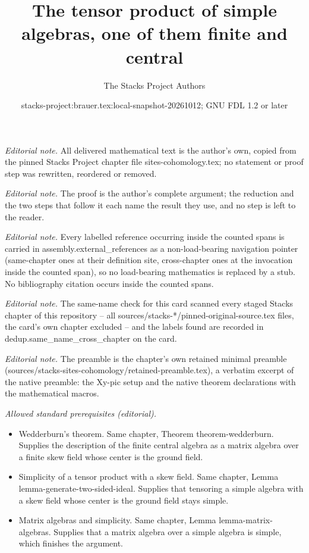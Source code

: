\documentclass[10pt,a4paper]{amsart}
\title{The tensor product of simple algebras, one of them finite and central}
\author{The Stacks Project Authors}
\date{stacks-project:brauer.tex:local-snapshot-20261012; GNU FDL 1.2 or later}
\theoremstyle{plain}
\theoremstyle{definition}
\theoremstyle{remark}
\numberwithin{equation}{subsection}
\begin{document}
\maketitle
\noindent\textit{Editorial note.} All delivered mathematical text is the author's own, copied from the pinned Stacks Project chapter file sites-cohomology.tex; no statement or proof step was rewritten, reordered or removed.\par\medskip
\noindent\textit{Editorial note.} The proof is the author's complete argument; the reduction and the two steps that follow it each name the result they use, and no step is left to the reader.\par\medskip
\noindent\textit{Editorial note.} Every labelled reference occurring inside the counted spans is carried in assembly.external\_references as a non-load-bearing navigation pointer (same-chapter ones at their definition site, cross-chapter ones at the invocation inside the counted span), so no load-bearing mathematics is replaced by a stub. No bibliography citation occurs inside the counted spans.\par\medskip
\noindent\textit{Editorial note.} The same-name check for this card scanned every staged Stacks chapter of this repository -- all sources/stacks-*/pinned-original-source.tex files, the card's own chapter excluded -- and the labels found are recorded in dedup.same\_name\_cross\_chapter on the card.\par\medskip
\noindent\textit{Editorial note.} The preamble is the chapter's own retained minimal preamble (sources/stacks-sites-cohomology/retained-preamble.tex), a verbatim excerpt of the native preamble: the Xy-pic setup and the native theorem declarations with the mathematical macros.\par\medskip
\noindent\textit{Allowed standard prerequisites (editorial).}\begin{itemize}
\item Wedderburn's theorem. Same chapter, Theorem theorem-wedderburn. Supplies the description of the finite central algebra as a matrix algebra over a finite skew field whose center is the ground field.
\item Simplicity of a tensor product with a skew field. Same chapter, Lemma lemma-generate-two-sided-ideal. Supplies that tensoring a simple algebra with a skew field whose center is the ground field stays simple.
\item Matrix algebras and simplicity. Same chapter, Lemma lemma-matrix-algebras. Supplies that a matrix algebra over a simple algebra is simple, which finishes the argument.
\end{itemize}\medskip
\end{document}
